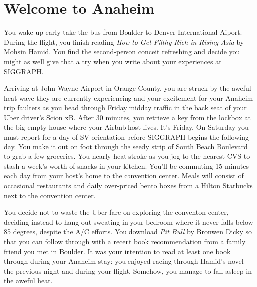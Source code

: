 \documentclass[../main.tex]{subfiles}
\begin{document}
\section{Welcome to Anaheim}

You wake up early take the bus from Boulder to Denver International Aiport. During the flight, you finish reading \textit{How to Get Filthy Rich in Rising Asia} by Mohsin Hamid. You find the second-person conceit refreshing and decide you might as well give that a try when you write about your experiences at SIGGRAPH.

Arriving at John Wayne Airport in Orange County, you are struck by the aweful heat wave they are currently experiencing and your excitement for your Anaheim trip faulters as you head through Friday midday traffic in the back seat of your Uber driver's Scion xB. After 30 minutes, you retrieve a key from the lockbox at the big empty house where your Airbnb host lives. It's Friday. On Saturday you must report for a day of SV orientation before SIGGRAPH begins the following day. You make it out on foot through the seedy strip of South Beach Boulevard to grab a few groceries. You nearly heat stroke as you jog to the nearest CVS to stash a week's worth of snacks in your kitchen. You'll be commuting 15 minutes each day from your host's home to the convention center. Meals will consist of occasional restaurants and daily over-priced bento boxes from a Hilton Starbucks next to the convention center.

You decide not to waste the Uber fare on exploring the conventon center, deciding instead to hang out sweating in your bedroom where it never falls below 85 degrees, despite the A/C efforts. You download \textit{Pit Bull} by Bronwen Dicky so that you can follow through with a recent book recommendation from a family friend you met in Boulder. It was your intention to read at least one book through during your Anaheim stay: you enjoyed racing through Hamid's novel the previous night and during your flight. Somehow, you manage to fall asleep in the aweful heat.
 
\end{document}
